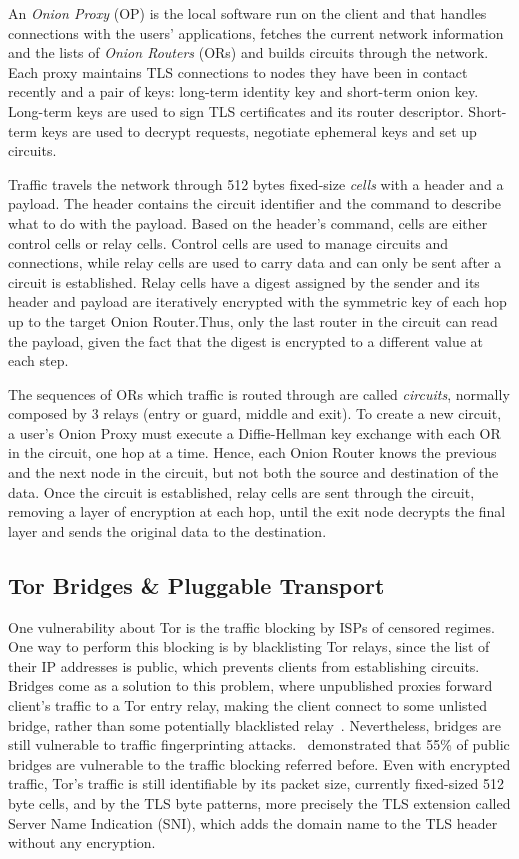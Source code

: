 An \textit{Onion Proxy} (OP) is the local software run on the client and that handles connections with the users' applications, fetches the current network information and the lists of \textit{Onion Routers} (ORs) and builds circuits through the network. Each proxy maintains TLS connections to nodes they have been in contact recently and a pair of keys: long-term identity key and short-term onion key. Long-term keys are used to sign TLS certificates and its router descriptor. Short-term keys are used to decrypt requests, negotiate ephemeral keys and set up circuits.

Traffic travels the network through 512 bytes fixed-size \textit{cells} with a header and a payload. The header contains the circuit identifier and the command to describe what to do with the payload. Based on the header's command, cells are either control cells or relay cells. Control cells are used to manage circuits and connections, while relay cells are used to carry data and can only be sent after a circuit is established. Relay cells have a digest assigned by the sender and its header and payload are iteratively encrypted with the symmetric key of each hop up to the target Onion Router.\@ Thus, only the last router in the circuit can read the payload, given the fact that the digest is encrypted to a different value at each step.

The sequences of ORs which traffic is routed through are called \textit{circuits}, normally composed by 3 relays (entry or guard, middle and exit).
To create a new circuit, a user's Onion Proxy must execute a Diffie-Hellman key exchange with each OR in the circuit, one hop at a time. Hence, each Onion Router knows the previous and the next node in the circuit, but not both the source and destination of the data. Once the circuit is established, relay cells are sent through the circuit, removing a layer of encryption at each hop, until the exit node decrypts the final layer and sends the original data to the destination.

\subsection{Tor Bridges \& Pluggable Transport}\label{subsec:tor_bridges}

One vulnerability about Tor is the traffic blocking by ISPs of censored regimes. One way to perform this blocking is by blacklisting Tor relays, since the list of their IP addresses is public, which prevents clients from establishing circuits. Bridges come as a solution to this problem, where unpublished proxies forward client's traffic to a Tor entry relay, making the client connect to some unlisted bridge, rather than some potentially blacklisted relay~\cite{Matic2017DissectingTB}.
Nevertheless, bridges are still vulnerable to traffic fingerprinting attacks.~\citeauthor{Matic2017DissectingTB} demonstrated that 55\% of public bridges are vulnerable to the traffic blocking referred before. Even with encrypted traffic, Tor's traffic is still identifiable by its packet size, currently fixed-sized 512 byte cells, and by the TLS byte patterns, more precisely the TLS extension called Server Name Indication (SNI), which adds the domain name to the TLS header without any encryption.

